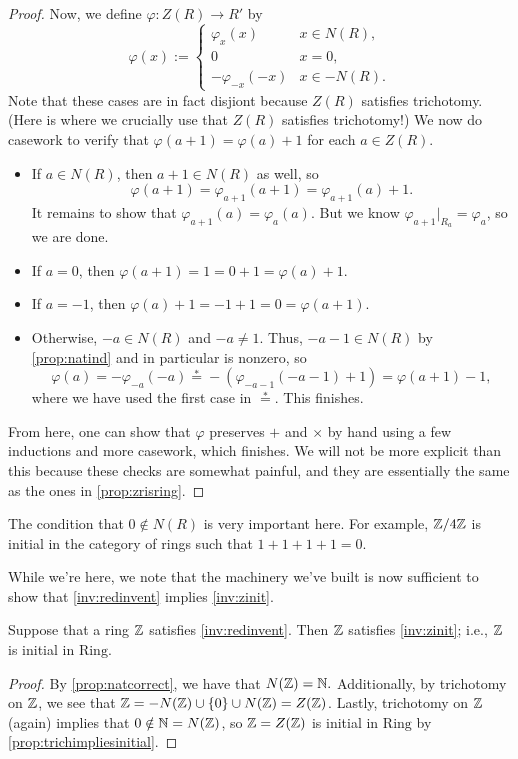 \documentclass{article}
\begin{document}
\begin{proof}
	Now, we define $\varphi:Z(R)\to R'$ by
	\[\varphi(x):=\begin{cases}
		\varphi_x(x) & x\in N(R), \\
		0 & x=0, \\
		-\varphi_{-x}(-x) & x\in-N(R).
	\end{cases}\]
	Note that these cases are in fact disjiont because $Z(R)$ satisfies trichotomy. (Here is where we crucially use that $Z(R)$ satisfies trichotomy!) We now do casework to verify that $\varphi(a+1)=\varphi(a)+1$ for each $a\in Z(R).$
	\begin{itemize}
		\item If $a\in N(R)$, then $a+1\in N(R)$ as well, so
		\[\varphi(a+1)=\varphi_{a+1}(a+1)=\varphi_{a+1}(a)+1.\]
		It remains to show that $\varphi_{a+1}(a)=\varphi_a(a)$. But we know $\varphi_{a+1}|_{R_a}=\varphi_a$, so we are done.
		\item If $a=0$, then $\varphi(a+1)=1=0+1=\varphi(a)+1$.
		\item If $a=-1$, then $\varphi(a)+1=-1+1=0=\varphi(a+1)$.
		\item Otherwise, $-a\in N(R)$ and $-a\ne1$. Thus, $-a-1\in N(R)$ by \autoref{prop:natind} and in particular is nonzero, so
		\[\varphi(a)=-\varphi_{-a}(-a)\stackrel*=-(\varphi_{-a-1}(-a-1)+1)=\varphi(a+1)-1,\]
		where we have used the first case in $\stackrel*=$. This finishes.
	\end{itemize}
	From here, one can show that $\varphi$ preserves $+$ and $\times$ by hand using a few inductions and more casework, which finishes. We will not be more explicit than this because these checks are somewhat painful, and they are essentially the same as the ones in \autoref{prop:zrisring}.
\end{proof}
\begin{remark} \label{rem:badinitial}
	The condition that $0\notin N(R)$ is very important here. For example, $\mathbb Z/4\mathbb Z$ is initial in the category of rings such that $1+1+1+1=0$.
\end{remark}
While we're here, we note that the machinery we've built is now sufficient to show that \autoref{inv:redinvent} implies \autoref{inv:zinit}.
\begin{theorem}
	Suppose that a ring $\mathbb Z$ satisfies \autoref{inv:redinvent}. Then $\mathbb Z$ satisfies \autoref{inv:zinit}; i.e., $\mathbb Z$ is initial in $\mathrm{Ring}$.
\end{theorem}
\begin{proof}
	By \autoref{prop:natcorrect}, we have that $N(\mathbb Z)=\mathbb N.$ Additionally, by trichotomy on $\mathbb Z$, we see that $\mathbb Z=-N(\mathbb Z)\cup\{0\}\cup N(\mathbb Z)=Z(\mathbb Z)$. Lastly, trichotomy on $\mathbb Z$ (again) implies that $0\notin\mathbb N=N(\mathbb Z)$, so $\mathbb Z=Z(\mathbb Z)$ is initial in $\mathrm{Ring}$ by \autoref{prop:trichimpliesinitial}.
\end{proof}
\end{document}
